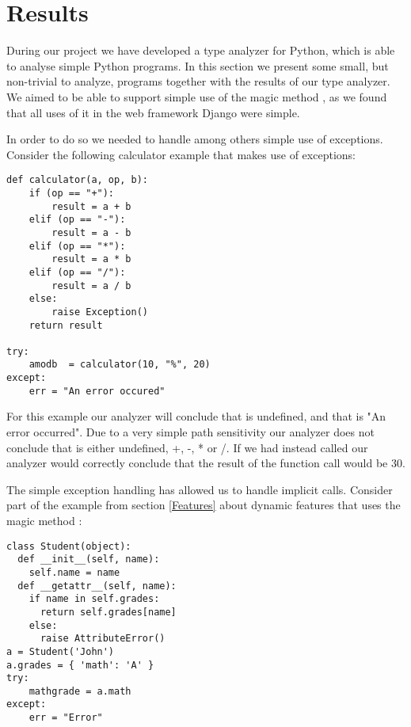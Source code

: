 \chapter{Results}
During our project we have developed a type analyzer for Python, which is able to analyse simple Python programs. In this section we present some small, but non-trivial to analyze, programs together with the results of our type analyzer. We aimed to be able to support simple use of the magic method , as we found that all uses of it in the web framework Django\cite{django} were simple.

In order to do so we needed to handle among others simple use of exceptions. Consider the following calculator example that makes use of exceptions:

\begin{listing}[H]
	\begin{verbatim}
def calculator(a, op, b):
	if (op == "+"):
		result = a + b
	elif (op == "-"):
		result = a - b
	elif (op == "*"):
		result = a * b
	elif (op == "/"):
		result = a / b
	else:
		raise Exception()
	return result

try:
	amodb  = calculator(10, "%", 20)
except:
	err = "An error occured"
	\end{verbatim}
\end{listing}

For this example our analyzer will conclude that  is undefined, and that  is "An error occurred". Due to a very simple path sensitivity our analyzer does not conclude that  is either undefined, +, -, * or /. If we had instead called  our analyzer would correctly conclude that the result of the function call would be 30.

The simple exception handling has allowed us to handle implicit  calls. Consider part of the  example from section \ref{Features} about dynamic features that uses the magic method :

\begin{listing}[H]
	\begin{verbatim}
class Student(object):
  def __init__(self, name):
    self.name = name
  def __getattr__(self, name):
    if name in self.grades:
      return self.grades[name]
    else:
      raise AttributeError()
a = Student('John')
a.grades = { 'math': 'A' }
try:
	mathgrade = a.math
except:
	err = "Error"
	\end{verbatim}
\end{listing}

